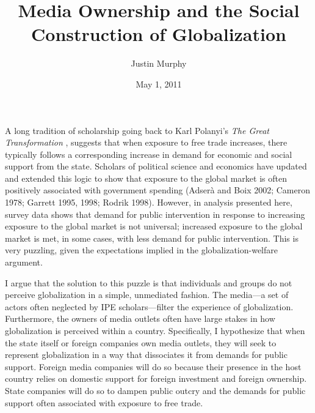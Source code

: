 \documentclass[a4paper]{article}
\begin{document}
\title{Media Ownership and the Social Construction of Globalization}

\author{Justin Murphy}
\date{May 1, 2011}

\maketitle


\doublespacing

	A long tradition of scholarship going back to Karl Polanyi's \emph{The Great Transformation} \parencite{Polanyi:2001vc}, suggests that when exposure to free trade increases, there typically follows a corresponding increase in demand for economic and social support from the state. Scholars of political science and economics have updated and extended this logic to show that exposure to the global market is often positively associated with government spending (Adserà and Boix 2002; Cameron 1978; Garrett 1995, 1998; Rodrik 1998). However, in analysis presented here, survey data shows that demand for public intervention in response to increasing exposure to the global market is not universal; increased exposure to the global market is met, in some cases, with less demand for public intervention. This is very puzzling, given the expectations implied in the globalization-welfare argument.

	I argue that the solution to this puzzle is that individuals and groups do not perceive globalization in a simple, unmediated fashion. The media---a set of actors often neglected by IPE scholars---filter the experience of globalization. Furthermore, the owners of media outlets often have large stakes in how globalization is perceived within a country. Specifically, I hypothesize that when the state itself or foreign companies own media outlets, they will seek to represent globalization in a way that dissociates it from demands for public support. Foreign media companies will do so because their presence in the host country relies on domestic support for foreign investment and foreign ownership. State companies will do so to dampen public outcry and the demands for public support often associated with exposure to free trade.
\end{document}
